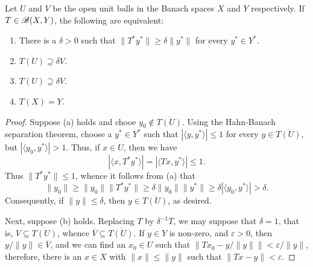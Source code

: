 \begin{theorem}
    Let $U$ and $V$ be the open unit balls in the Banach spaces $X$ and $Y$ respectively. If $T\in\mathscr B(X, Y)$, the following are equivalent:
    \begin{enumerate}[label=(\alph*)]
        \item There is a $\delta > 0$ such that $\|T^\ast y^\ast\|\ge\delta\|y^\ast\|$ for every $y^\ast\in Y^\ast$. 
        \item $\overline{T(U)}\supseteq\delta V$. 
        \item $T(U)\supseteq\delta V$. 
        \item $T(X) = Y$.
    \end{enumerate}
\end{theorem}
\begin{proof}
    Suppose (a) holds and chooe $y_0\notin\overline{T(U)}$. Using the Hahn-Banach separation theorem, choose a $y^\ast\in Y^\ast$ such that $|\langle y, y^\ast\rangle|\le 1$ for every $y\in \overline{T(U)}$, but $|\langle y_0, y^\ast\rangle| > 1$. Thus, if $x\in U$, then we have 
    \begin{equation*}
        |\langle x, T^\ast y^\ast\rangle| = |\langle Tx, y^\ast\rangle|\le 1.
    \end{equation*}
    Thus $\|T^\ast y^\ast\|\le 1$, whence it follows from (a) that 
    \begin{equation*}
        \|y_0\|\ge\|y_0\|\|T^\ast y^\ast\|\ge\delta\|y_0\|\|y^\ast\|\ge\delta|\langle y_0, y^\ast\rangle| > \delta.
    \end{equation*}
    Consequently, if $\|y\|\le\delta$, then $y\in\overline{T(U)}$, as desired. 

    Next, suppose (b) holds. Replacing $T$ by $\delta^{-1}T$, we may suppose that $\delta = 1$, that is, $V\subseteq\overline{T(U)}$, whence $\overline V\subseteq\overline{T(U)}$. If $y\in Y$ is non-zero, and $\varepsilon > 0$, then $y/\|y\|\in\overline V$, and we can find an $x_0\in U$ such that $\|Tx_0 - y/\|y\|\| < \varepsilon/\|y\|$, therefore, there is an $x\in X$ with $\|x\|\le \|y\|$ such that $\|Tx - y\| < \varepsilon$.


\end{proof}
